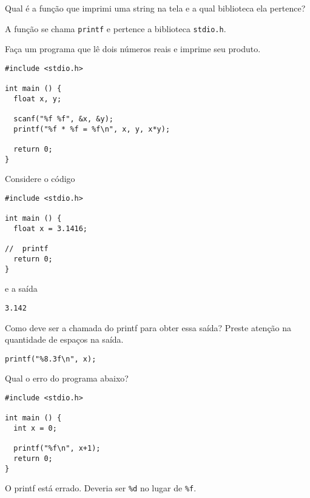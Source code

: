 \begin{Exercise}[label={0001}, difficulty={0}, origin={io}]
  Qual é a função que imprimi uma string na tela e a qual biblioteca ela
  pertence?
\end{Exercise}
\begin{Answer}[ref={0001}]
  A função se chama \lstinline+printf+ e pertence a biblioteca
  \lstinline+stdio.h+.
\end{Answer}

\begin{Exercise}[label={0002}, difficulty={0}, origin={io}]
  Faça um programa que lê dois números reais e imprime seu produto.
\end{Exercise}
\begin{Answer}[ref={0002}]
\begin{lstlisting}
#include <stdio.h>

int main () {
  float x, y;

  scanf("%f %f", &x, &y);
  printf("%f * %f = %f\n", x, y, x*y);
  
  return 0;
}
\end{lstlisting}
\end{Answer}

\begin{Exercise}[label={0003}, difficulty={1}, origin={io}]
  Considere o código
\begin{lstlisting}
#include <stdio.h>

int main () {
  float x = 3.1416;

//  printf
  return 0;
}
\end{lstlisting}
e a saída
\begin{lstlisting}[showspaces=true]
   3.142
\end{lstlisting}
  Como deve ser a chamada do printf para obter essa saída? Preste atenção na quantidade
  de espaços na saída.
\end{Exercise}
\begin{Answer}[ref={0003}]
\begin{lstlisting}[firstnumber=6]
printf("%8.3f\n", x);
\end{lstlisting}
\end{Answer}

\begin{Exercise}[label={0004}, difficulty={1}, origin={type}]
  Qual o erro do programa abaixo?
\begin{lstlisting}
#include <stdio.h>

int main () {
  int x = 0;

  printf("%f\n", x+1);
  return 0;
}
\end{lstlisting}
\end{Exercise}
\begin{Answer}[ref={0004}]
  O printf está errado. Deveria ser \lstinline+%d+ no lugar de
  \lstinline+%f+.
\end{Answer}

